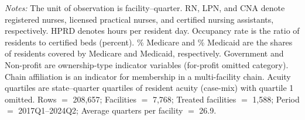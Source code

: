 \documentclass[11pt]{article}
\begin{document}
\begin{table}[!ht]
\begin{threeparttable}
\begin{tablenotes}[flushleft]
\footnotesize
\item \textit{Notes:} The unit of observation is facility--quarter. RN, LPN, and CNA denote registered nurses, licensed practical nurses, and certified nursing assistants, respectively. HPRD denotes hours per resident day. Occupancy rate is the ratio of residents to certified beds (percent). \% Medicare and \% Medicaid are the shares of residents covered by Medicare and Medicaid, respectively. Government and Non-profit are ownership-type indicator variables (for-profit omitted category). Chain affiliation is an indicator for membership in a multi-facility chain. Acuity quartiles are state--quarter quartiles of resident acuity (case-mix) with quartile 1 omitted. Rows $=$ 208,657; Facilities $=$ 7,768; Treated facilities $=$ 1,588; Period $=$ 2017Q1--2024Q2; Average quarters per facility $=$ 26.9.
\end{tablenotes}

\end{threeparttable}
\end{table}
\end{document}

